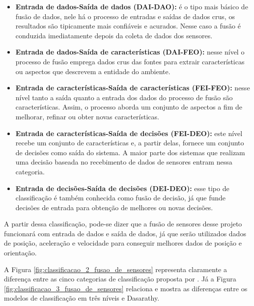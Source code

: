 \documentclass[acronym, symbols, table]{fei}
\begin{document}
				\begin{itemize}
					\item \textbf{Entrada de dados-Saída de dados (DAI-DAO):} é o tipo mais básico de fusão de dados, nele há o processo de entradas e saídas de dados crus, os resultados são tipicamente mais confiáveis e acurados. Nesse caso a fusão é conduzida imediatamente depois da coleta de dados dos sensores.
					
					\item \textbf{Entrada de dados-Saída de características (DAI-FEO):} nesse nível o processo de fusão emprega dados crus das fontes para extrair características ou aspectos que descrevem a entidade do ambiente.
					
					\item \textbf{Entrada de características-Saída de características (FEI-FEO):} nesse nível tanto a saída quanto a entrada dos dados do processo de fusão são características. Assim, o processo aborda um conjunto de aspectos a fim de melhorar, refinar ou obter novas características.
					
					\item \textbf{Entrada de características-Saída de decisões (FEI-DEO):} este nível recebe um conjunto de características e, a partir delas, fornece um conjunto de decisões como saída do sistema. A maior parte dos sistemas que realizam uma decisão baseada no recebimento de dados de sensores entram nessa categoria.
					
					\item \textbf{Entrada de decisões-Saída de decisões (DEI-DEO):} esse tipo de classificação é também conhecida como fusão de decisão, já que funde decisões de entrada para obtenção de melhores ou novas decisões.
				\end{itemize}
				
				A partir dessa classificação, pode-se dizer que a fusão de sensores desse projeto funcionará com entrada de dados e saída de dados, já que serão utilizados dados de posição, aceleração e velocidade para conseguir melhores dados de posição e orientação.
				
				A Figura \ref{fig:classificacao_2_fusao_de_sensores} representa claramente a diferença entre as cinco categorias de classificação proposta por \textcite{dasarathy1997sensor}. Já a Figura \ref{fig:classificacao_3_fusao_de_sensores} relaciona e mostra as diferenças entre os modelos de classificação em três níveis e Dasarathy.
			
\end{document}
